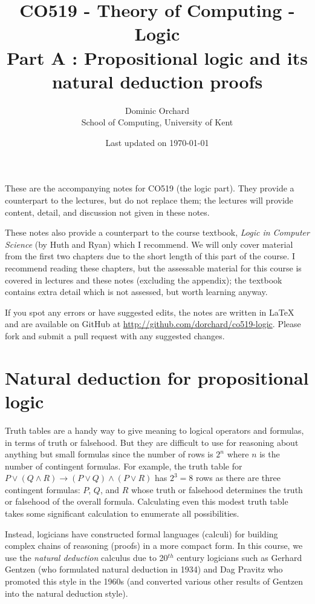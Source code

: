 \documentclass{article}
\title{\vspace{-3em}CO519 - Theory of Computing - Logic \\
  {\large{Part A : Propositional logic and its natural deduction
      proofs}}}
\author{Dominic Orchard \\
  {\small{School of Computing, University of Kent}}}
\date{Last updated on \today}
\theoremstyle{definition}
\begin{document}
\maketitle

These are the accompanying notes for CO519 (the logic part). They provide
a counterpart to the lectures, but do not replace them; the lectures
will provide content, detail, and discussion not given in these notes.

These notes also provide a counterpart to the course textbook,
\emph{Logic in Computer Science} (by Huth and Ryan) which I
recommend. We will only cover material from the first two chapters due
to the short length of this part of the course. I recommend reading
these chapters, but the assessable material for this course is
covered in lectures and these notes (excluding the appendix); the
textbook contains extra detail which is not assessed, but
worth learning anyway.

If you spot any errors or have suggested edits, the notes are written
in LaTeX and are available on GitHub at
\url{http://github.com/dorchard/co519-logic}. Please fork and submit a
pull request with any suggested changes.

\section{Natural deduction for propositional logic}

Truth tables are a handy way to give meaning to logical operators and
formulas, in terms of truth or falsehood. But they are difficult to
use for reasoning about anything but small formulas since the number
of rows is $2^n$ where $n$ is the number of contingent
formulas. For example, the truth table for
$P \vee (Q \wedge R) \rightarrow (P \vee Q) \wedge (P \vee R)$ has
$2^3 = 8$ rows as there are three contingent formulas: $P$, $Q$, and
$R$ whose truth or falsehood determines the truth or falsehood of the
overall formula. Calculating even this modest truth table takes some
significant calculation to enumerate all possibilities.

Instead, logicians have constructed formal languages (calculi) for
building complex chains of reasoning (proofs) in a more
compact form. In this course, we use the \emph{natural deduction} calculus
due to 20$^{th}$ century logicians such as Gerhard Gentzen
(who formulated natural deduction in 1934) and Dag Pravitz who
promoted this style in the 1960s (and converted
various other results of Gentzen into the natural deduction style).
\end{document}
